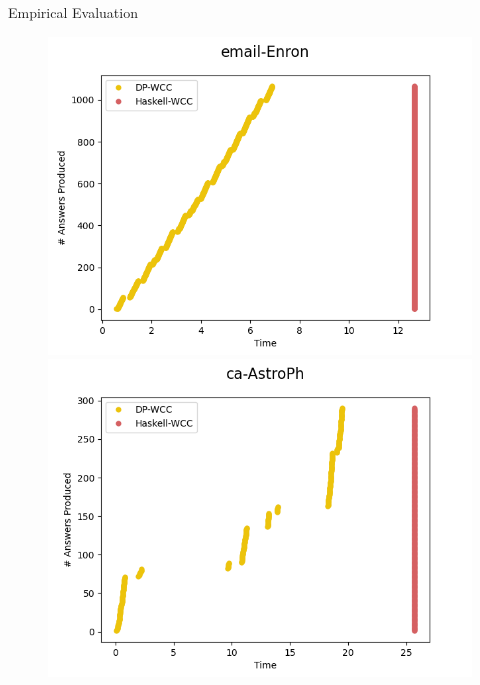 \documentclass{beamer}
\begin{document}
\begin{frame}[fragile]{Empirical Evaluation}
      \begin{figure}[!htb]
        \centering
        \begin{minipage}{0.33\textwidth}
         \includegraphics[width=1\linewidth, height=0.2\textheight]{email_enron}
        \end{minipage}%
        \begin{minipage}{0.33\textwidth}
         \includegraphics[width=1\linewidth, height=0.2\textheight]{ca_astroph}
        \end{minipage}%
        \begin{minipage}{0.33\textwidth}

\end{minipage}
\end{figure}
\end{frame}
\end{document}
